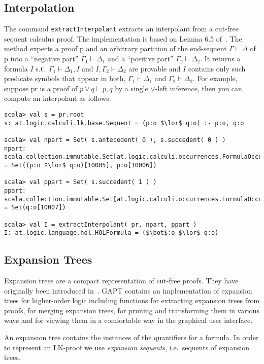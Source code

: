 \documentclass[a4paper,11pt]{article}
\newcommand{\seq}{\vdash}	%
\renewcommand{\lor}{\vee}
\begin{document}
\subsection{Interpolation}

The command \texttt{extractInterpolant} extracts an interpolant from a cut-free
sequent calculus proof. The implementation is based on Lemma 6.5 of~\cite{Takeuti87Proof}. The method expects
a proof p and an arbitrary partition of the end-sequent $\Gamma \seq \Delta$ of p into a 
``negative part'' $\Gamma_1\seq\Delta_1$ and a ``positive part'' $\Gamma_2 \seq \Delta_2$.
It returns a formula $I$ s.t.\ $\Gamma_1\seq\Delta_1, I$ and $I,\Gamma_2\seq\Delta_2$
are provable and $I$ contains only such predicate symbols that appear in both, $\Gamma_1\seq\Delta_1$
and $\Gamma_2\seq\Delta_2$. For example, suppose pr is a proof of $p \lor q \seq p, q$
by a single $\lor$-left inference, then you can compute an interpolant as follows:
\begin{lstlisting}
scala> val s = pr.root
s: at.logic.calculi.lk.base.Sequent = (p:o $\lor$ q:o) :- p:o, q:o

scala> val npart = Set( s.antecedent( 0 ), s.succedent( 0 ) )
npart: scala.collection.immutable.Set[at.logic.calculi.occurrences.FormulaOccurrence] = Set((p:o $\lor$ q:o)[10005], p:o[10006])

scala> val ppart = Set( s.succedent( 1 ) )
ppart: scala.collection.immutable.Set[at.logic.calculi.occurrences.FormulaOccurrence] = Set(q:o[10007])

scala> val I = extractInterpolant( pr, npart, ppart )
I: at.logic.language.hol.HOLFormula = ($\bot$:o $\lor$ q:o)
\end{lstlisting}

\subsection{Expansion Trees}

Expansion trees are a compact representation of cut-free proofs. They have originally been
introduced in~\cite{Miller87Compact}. GAPT contains an implementation of
expansion trees for higher-order logic including functions for extracting expansion
trees from proofs, for merging expansion trees, for pruning and transforming them
in various ways and for viewing them in a comfortable way in the graphical user interface.

An expansion tree contains the instances of the quantifiers for a formula. In order
to represent an LK-proof we use {\em expansion sequents}, i.e.~sequents of expansion trees.
\end{document}
